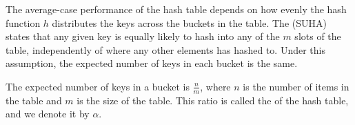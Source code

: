 The average-case performance of the hash table depends on how evenly the hash function $h$ distributes the keys across the buckets in the table. The (SUHA) states that any given key is equally likely to hash into any of the $m$ slots of the table, independently of where any other elements has hashed to. Under this assumption, the expected number of keys in each bucket is the same. 

The expected number of keys in a bucket is $\frac{n}{m}$, where $n$ is the number of items in the table and $m$ is the size of the table. This ratio is called the  of the hash table, and we denote it by $\alpha$.